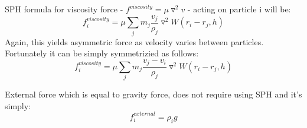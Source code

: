 SPH formula for viscosity force - $f^{viscosity} =  \mu \triangledown^2v$ - acting on particle i will be:
\begin{equation}
\label{eq:sph_viscosity_force}
f^{viscosity}_i = \mu \sum_{j}m_j \frac{v_j}{\rho_j}\triangledown^2 W(r_i - r_j, h) 
\end{equation}
Again, this yields asymmetric force as velocity varies between particles. Fortunately it can be simply symmetrizied as follows:
\begin{equation}
\label{eq:sph_viscosity_force_sym}
f^{viscosity}_i = \mu \sum_{j}m_j \frac{v_j - v_i}{\rho_j}\triangledown^2 W(r_i - r_j, h) 
\end{equation}

External force which is equal to gravity force, does not require using SPH and it's simply:
\begin{equation}
f^{external}_i = \rho_i g
\end{equation}


